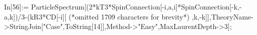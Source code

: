 In[56]:= ParticleSpectrum[(2*kT3*SpinConnection[-i,a,i]*SpinConnection[-k,-a,k])/3-(kR3*CD[-i][ (*omitted 1709 characters for brevity*) ,k,-k]],TheoryName->StringJoin["Case",ToString[14]],Method->"Easy",MaxLaurentDepth->3];
